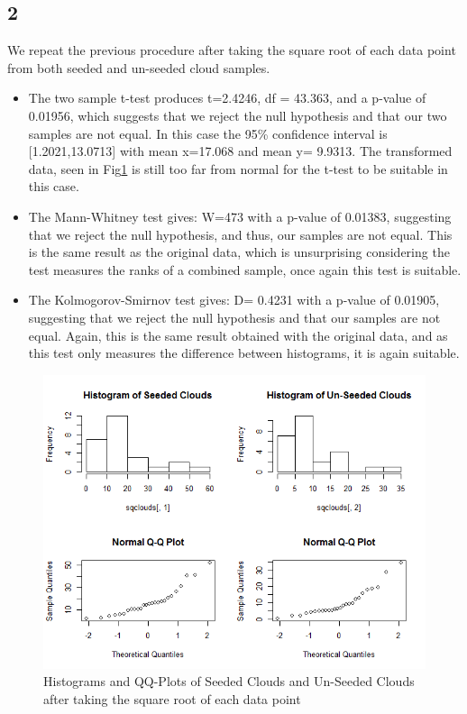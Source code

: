 \documentclass{article}
\begin{document}
    \subsection*{2}
    We repeat the previous procedure after taking the square root of each data point from both seeded and un-seeded cloud samples.
    \begin{itemize}
    \item The two sample t-test produces t=2.4246, df = 43.363, and a p-value of 0.01956, which suggests that we reject the null hypothesis and that our two samples are not equal. In this case the 95\% confidence interval is [1.2021,13.0713] with mean x=17.068 and mean y= 9.9313. The transformed data, seen in Fig\ref{fig:sq(clouds)} is still too far from normal for the t-test to be suitable in this case.
    \item The Mann-Whitney test gives: W=473 with a p-value of 0.01383, suggesting that we reject the null hypothesis, and thus, our samples are not equal. This is the same result as the original data, which is unsurprising considering the test measures the ranks of a combined sample, once again this test is suitable.
    \item The Kolmogorov-Smirnov test gives: D= 0.4231 with a p-value of 0.01905, suggesting that we reject the null hypothesis and that our samples are not equal. Again, this is the same result obtained with the original data, and as this test only measures the difference between histograms, it is again suitable.
    \end{itemize}
    
    \begin{figure}[!htb]
      \includegraphics[scale=0.5]{../results/2_2.png}
      \caption{Histograms and QQ-Plots of Seeded Clouds and Un-Seeded Clouds after taking the square root of each data point}
      \label{fig:sq(clouds)}
    \end{figure}
    
\end{document}
